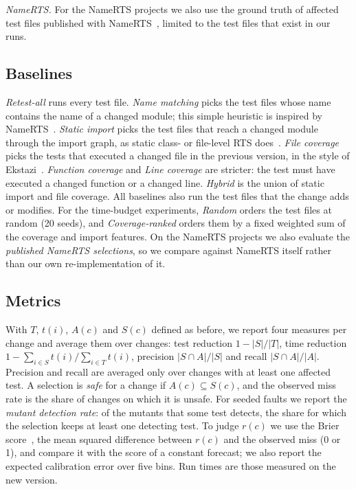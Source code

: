 \documentclass[conference]{IEEEtran}
\begin{document}
\emph{NameRTS.} For the NameRTS projects we also use the ground truth of affected test files published with NameRTS~\cite{wang2026namerts}, limited to the test files that exist in our runs.

\subsection{Baselines}
\textit{Retest-all} runs every test file. \textit{Name matching} picks the test files whose name contains the name of a changed module; this simple heuristic is inspired by NameRTS~\cite{wang2026namerts}. \textit{Static import} picks the test files that reach a changed module through the import graph, as static class- or file-level RTS does~\cite{legunsen2016static}. \textit{File coverage} picks the tests that executed a changed file in the previous version, in the style of Ekstazi~\cite{gligoric2015ekstazi}. \textit{Function coverage} and \textit{Line coverage} are stricter: the test must have executed a changed function or a changed line. \textit{Hybrid} is the union of static import and file coverage. All baselines also run the test files that the change adds or modifies. For the time-budget experiments, \textit{Random} orders the test files at random (20 seeds), and \textit{Coverage-ranked} orders them by a fixed weighted sum of the coverage and import features. On the NameRTS projects we also evaluate the \textit{published NameRTS selections}, so we compare against NameRTS itself rather than our own re-implementation of it.

\subsection{Metrics}
With $T$, $t(i)$, $A(c)$ and $S(c)$ defined as before, we report four measures per change and average them over changes: test reduction $1-|S|/|T|$, time reduction $1-\sum_{i\in S}t(i)/\sum_{i\in T}t(i)$, precision $|S\cap A|/|S|$ and recall $|S\cap A|/|A|$. Precision and recall are averaged only over changes with at least one affected test. A selection is \textit{safe} for a change if $A(c)\subseteq S(c)$, and the observed miss rate is the share of changes on which it is unsafe. For seeded faults we report the \textit{mutant detection rate}: of the mutants that some test detects, the share for which the selection keeps at least one detecting test. To judge $r(c)$ we use the Brier score~\cite{brier1950verification}, the mean squared difference between $r(c)$ and the observed miss (0 or 1), and compare it with the score of a constant forecast; we also report the expected calibration error over five bins. Run times are those measured on the new version.
\end{document}
